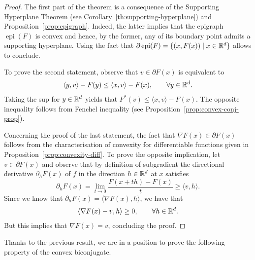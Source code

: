  \begin{proof}
     The first part of the theorem is a consequence of the Supporting Hyperplane Theorem (see Corollary~\ref{th:supporting-hyperplane}) and Proposition~\ref{prop:epigraph}. Indeed, the latter implies that the epigraph $\operatorname{epi}(F)$ is convex and hence, by the former, any of its boundary point admits a supporting hyperplane. Using the fact that $\partial\operatorname{epi}(F)=\{(x,F(x))\mid x\in\mathbb{R}^d\}$ allows to conclude.
 
     To prove the second statement, observe that $v\in\partial F(x)$ is equivalent to
     \begin{equation}
         \langle y,v\rangle - F(y) \le \langle x,v\rangle-F(x), \qquad \forall y\in\mathbb{R}^d.
     \end{equation}
     Taking the sup for $y\in\mathbb{R}^d$ yields that $F^*(v)\le \langle x,v\rangle -F(x)$. The opposite inequality follows from Fenchel inequality (see Proposition~\ref{prop:convex-conj-prop}).
 
     Concerning the proof of the last statement, the fact that $\nabla F(x)\in \partial F(x)$ follows from the characterisation of convexity for differentiable functions given in Proposition~\ref{prop:convexity-diff}.
     To prove the opposite implication, let $v\in \partial F(x)$ and observe that by definition of subgradient the directional derivative $\partial_h F(x)$ of $f$ in the direction $h\in\mathbb{R}^d$ at $x$ satisfies
     \begin{equation}
         \partial_h F(x) = \lim_{t\to 0} \frac{F(x+th)-F(x)}{t} \ge \langle v, h\rangle.
     \end{equation}
     Since we know that $\partial_hF (x)=\langle \nabla F(x),h\rangle$, we have that
     \begin{equation}
         \langle \nabla F(x) - v,h\rangle \ge 0, \qquad \forall h\in\mathbb{R}^d.
     \end{equation}
     But this implies that $\nabla F(x)=v$, concluding the proof.
 \end{proof}
 
 
 
 Thanks to the previous result, we are in a position to prove the following property of the convex biconjugate.
 
 
